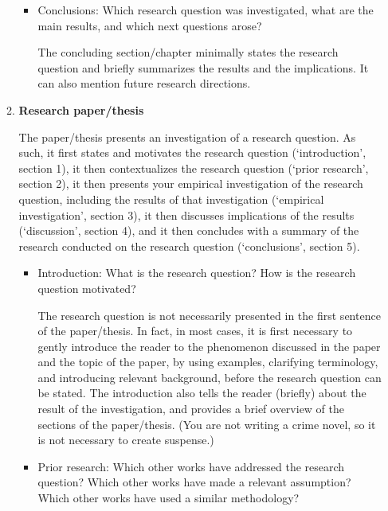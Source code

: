 \documentclass[11pt,fleqn,a4paper/thesis]{article}
\newcommand{\6}{\mbox{$[\hspace*{-.6mm}[$}}
\newcommand{\9}{\mbox{$]\hspace*{-.6mm}]$}}
\begin{document}
\begin{itemize}[itemsep=-1pt,leftmargin=2.5ex,topsep=-2pt]
\begin{enumerate}
\begin{itemize}[leftmargin=2.5ex,topsep=-2pt]
\item Conclusions: Which research question was investigated, what are the main results, and which next questions arose?

The concluding section/chapter minimally states the research question and briefly summarizes the results and the implications. It can also mention future research directions. 

\end{itemize}

\item {\bf Research paper/thesis}

The paper/thesis presents an investigation of a research question. As such, it first states and motivates the research question (`introduction', section 1), it then contextualizes the research question (`prior research', section 2), it then presents your empirical investigation of the research question, including the results of that investigation (`empirical investigation', section 3), it then discusses implications of the results (`discussion', section 4), and it then concludes with a summary of the research conducted on the research question (`conclusions', section 5).

\begin{itemize}[leftmargin=2.5ex,topsep=-2pt]

\item Introduction: What is the research question? How is the research question motivated?

The research question is not necessarily presented in the first sentence of the paper/thesis. In fact, in most cases, it is first necessary to gently introduce the reader to the phenomenon discussed in the paper and the topic of the paper, by using examples, clarifying terminology, and introducing relevant background, before the research question can be stated. The introduction also tells the reader (briefly) about the result of the investigation, and provides a brief overview of the sections of the paper/thesis. (You are not writing a crime novel, so it is not necessary to create suspense.)

\item Prior research: Which other works have addressed the research question? Which other works have made a relevant assumption? Which other works have used a similar methodology?


\end{itemize}
\end{enumerate}
\end{itemize}
\end{document}
